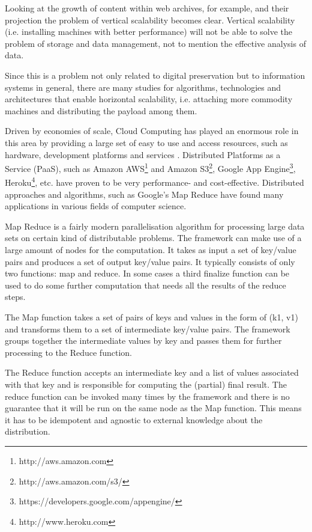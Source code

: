 Looking at the growth of content within web archives, for example, and their projection the problem of vertical scalability becomes clear. Vertical scalability (i.e. installing machines with better performance) will not be able to solve the problem of storage and data management, not to mention the effective analysis of data.

Since this is a problem not only related to digital preservation but to information systems in general, there are many studies for algorithms, technologies and architectures that enable horizontal scalability, i.e. attaching more commodity machines and distributing the payload among them.

Driven by economies of scale, Cloud Computing has played an enormous role in this area by providing a large set of easy to use and access resources, such as hardware, development platforms and services \cite{Vaquero:2008, 4738445}. Distributed Platforms as a Service (PaaS), such as Amazon AWS\footnote{http://aws.amazon.com} and Amazon S3\footnote{http://aws.amazon.com/s3/}, Google App Engine\footnote{https://developers.google.com/appengine/}, Heroku\footnote{http://www.heroku.com}, etc. have proven to be very performance- and cost-effective. Distributed approaches and algorithms, such as Google's Map Reduce \cite{Dean:2008:MSD:1327452.1327492} have found many applications in various fields of computer science. 

Map Reduce is a fairly modern parallelisation algorithm for processing large data sets on certain kind of distributable problems. The framework can make use of a large amount of nodes for the computation. It takes as input a set of key/value pairs and produces a set of output key/value pairs. It typically consists of only two functions: map and reduce. In some cases a third finalize function can be used to do some further computation that needs all the results of the reduce steps.

The Map function takes a set of pairs of keys and values in the form of (k1, v1) and transforms them to a set of intermediate key/value pairs. The framework groups together the intermediate values by key and passes them for further processing to the Reduce function.

The Reduce function accepts an intermediate key and a list of values associated with that key and is responsible for computing the (partial) final result. The reduce function can be invoked many times by the framework and there is no guarantee that it will be run on the same node as the Map function. This means it has to be idempotent and agnostic to external knowledge about the distribution.

